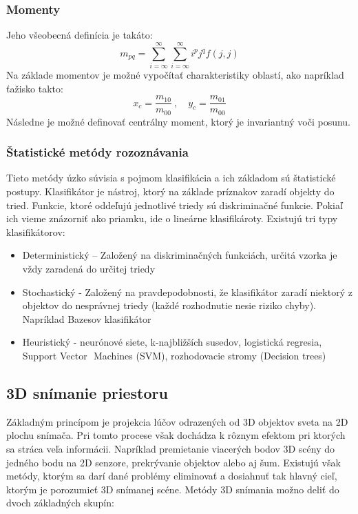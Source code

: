 \subsubsection{Momenty}

Jeho všeobecná definícia je takáto:
$$m_{pq}=\sum_{i=\infty}^\infty \sum_{i=\infty}^\infty i^p j^q f(j,j)$$
Na základe momentov je možné vypočítať charakteristiky oblastí, ako napríklad ťažisko takto: 
$$x_c=\frac{m_{10}}{m_{00}}\ {,}\quad y_c=\frac{m_{01}}{m_{00}}$$
Následne je možné definovať centrálny moment, ktorý je invariantný voči posunu. 


\subsubsection{Štatistické metódy rozoznávania}
Tieto metódy úzko súvisia s pojmom klasifikácia a ich základom sú štatistické postupy. Klasifikátor je nástroj, ktorý na základe príznakov zaradí objekty do tried. Funkcie, ktoré oddeľujú jednotlivé triedy sú diskriminačné funkcie. Pokiaľ ich vieme znázorniť ako priamku, ide o lineárne klasifikároty. Existujú tri typy klasifikátorov: 

\begin{itemize}
\item Deterministický  – Založený na diskriminačných funkciách, určitá vzorka je vždy zaradená do určitej triedy 
\item Stochastický -  Založený na pravdepodobnosti, že klasifikátor zaradí niektorý z objektov do nesprávnej triedy (každé rozhodnutie nesie riziko chyby).  Napríklad Bazesov klasifikátor
\item Heuristický - neurónové siete, k-najbližších susedov, logistická regresia, Support Vector  Machines (SVM), rozhodovacie stromy (Decision trees) 
\end{itemize}

\subsection{3D snímanie priestoru}
Základným princípom je projekcia lúčov odrazených od 3D objektov sveta na 2D plochu snímača. Pri tomto procese však dochádza k rôznym efektom pri ktorých sa stráca veľa informácii. Napríklad premietanie viacerých bodov 3D scény do jedného bodu na 2D senzore, prekrývanie objektov alebo aj šum. Existujú však metódy, ktorým sa darí dané problémy eliminovať a dosiahnuť tak  hlavný cieľ, ktorým je porozumieť 3D snímanej scéne. Metódy 3D snímania možno deliť do dvoch základných skupín: 


